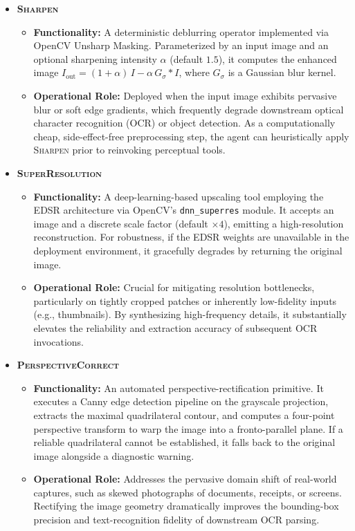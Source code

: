 \begin{itemize}[leftmargin=*,itemsep=5pt]

    \item \textbf{\textsc{Sharpen}}
    \begin{itemize}
        \item \textbf{Functionality:} A deterministic deblurring operator implemented via OpenCV Unsharp Masking. Parameterized by an input image and an optional sharpening intensity $\alpha$ (default $1.5$), it computes the enhanced image $I_{\text{out}} = (1{+}\alpha)\,I - \alpha\,G_\sigma * I$, where $G_\sigma$ is a Gaussian blur kernel.
        \item \textbf{Operational Role:} Deployed when the input image exhibits pervasive blur or soft edge gradients, which frequently degrade downstream optical character recognition (OCR) or object detection. As a computationally cheap, side-effect-free preprocessing step, the agent can heuristically apply \textsc{Sharpen} prior to reinvoking perceptual tools.
    \end{itemize}

    \item \textbf{\textsc{SuperResolution}}
    \begin{itemize}
        \item \textbf{Functionality:} A deep-learning-based upscaling tool employing the EDSR architecture via OpenCV's \texttt{dnn\_superres} module. It accepts an image and a discrete scale factor (default $\times 4$), emitting a high-resolution reconstruction. For robustness, if the EDSR weights are unavailable in the deployment environment, it gracefully degrades by returning the original image.
        \item \textbf{Operational Role:} Crucial for mitigating resolution bottlenecks, particularly on tightly cropped patches or inherently low-fidelity inputs (e.g., thumbnails). By synthesizing high-frequency details, it substantially elevates the reliability and extraction accuracy of subsequent \textsc{OCR} invocations.
    \end{itemize}

    \item \textbf{\textsc{PerspectiveCorrect}}
    \begin{itemize}
        \item \textbf{Functionality:} An automated perspective-rectification primitive. It executes a Canny edge detection pipeline on the grayscale projection, extracts the maximal quadrilateral contour, and computes a four-point perspective transform to warp the image into a fronto-parallel plane. If a reliable quadrilateral cannot be established, it falls back to the original image alongside a diagnostic warning.
        \item \textbf{Operational Role:} Addresses the pervasive domain shift of real-world captures, such as skewed photographs of documents, receipts, or screens. Rectifying the image geometry dramatically improves the bounding-box precision and text-recognition fidelity of downstream \textsc{OCR} parsing.
    \end{itemize}

\end{itemize}

